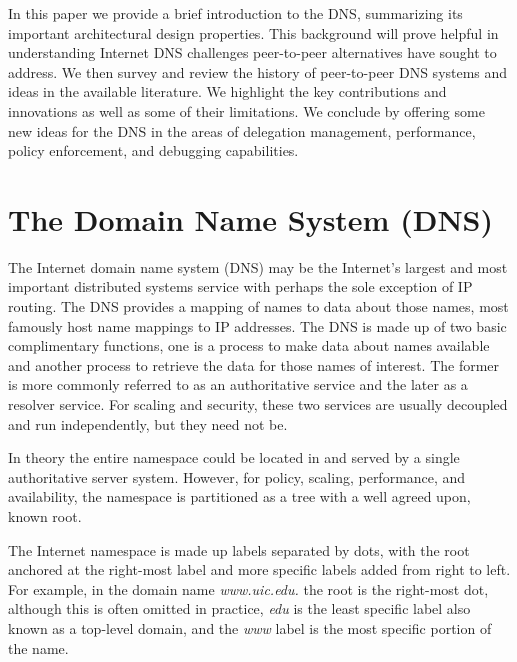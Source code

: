 \documentclass[sigconf]{acmart}
\begin{document}
In this paper we provide a brief introduction to the DNS, summarizing
its important architectural design properties.  This background will
prove helpful in understanding Internet DNS challenges peer-to-peer
alternatives have sought to address.  We then survey and review the
history of peer-to-peer DNS systems and ideas in the available
literature.  We highlight the key contributions and innovations as well
as some of their limitations.  We conclude by offering some new ideas
for the DNS in the areas of delegation management, performance, policy
enforcement, and debugging capabilities.

\section{The Domain Name System (DNS)}

The Internet domain name system (DNS) may be the Internet's largest
and most important distributed systems service with perhaps the sole
exception of IP
routing.\cite{mockapetris_domain_1987}\cite{mockapetris_domain_1987-1}
The DNS provides a mapping of names to data about those names, most
famously host name mappings to IP addresses.  The DNS is made up of two
basic complimentary functions, one is a process to make data about
names available and another process to retrieve the data for those names
of interest.  The former is more commonly referred to as an
authoritative service and the later as a resolver service.  For scaling
and security, these two services are usually decoupled and run
independently, but they need not be.

In theory the entire namespace could be located in and served by a
single authoritative server system.  However, for policy, scaling,
performance, and availability, the namespace is partitioned as a tree
with a well agreed upon, known root.

The Internet namespace is made up labels separated by dots, with the
root anchored at the right-most label and more specific labels added
from right to left.  For example, in the domain name \emph{www.uic.edu.}
the root is the right-most dot, although this is often omitted in
practice, \emph{edu} is the least specific label also known as a
top-level domain, and the \emph{www} label is the most specific portion
of the name.
\end{document}
